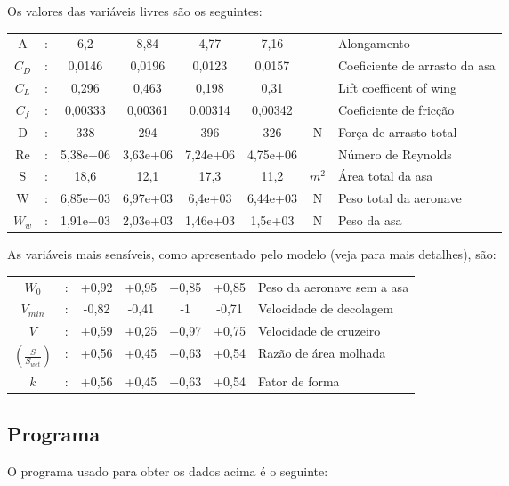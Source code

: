 \documentclass{article}
\begin{document}
Os valores das variáveis livres são os seguintes:

\begin{tabular}{|c c c c c c c l|}
  \hline
  A & : & 6,2 & 8,84 & 4,77 & 7,16 & & Alongamento \\ $C_D$ & : &
  0,0146 & 0,0196 & 0,0123 & 0,0157 & & Coeficiente de arrasto da asa
  \\ $C_L$ & : & 0,296 & 0,463 & 0,198 & 0,31 & & Lift coefficent of
  wing \\ $C_f$ & : & 0,00333 & 0,00361 & 0,00314 & 0,00342 & &
  Coeficiente de fricção \\ D & : & 338 & 294 & 396 & 326 & N & Força
  de arrasto total \\ Re & : & 5,38e+06 & 3,63e+06 & 7,24e+06 &
  4,75e+06 & & Número de Reynolds \\ S & : & 18,6 & 12,1 & 17,3 & 11,2
  & $m^2$ & Área total da asa \\ W & : & 6,85e+03 & 6,97e+03 & 6,4e+03
  & 6,44e+03 & N & Peso total da aeronave \\ $W_w$ & : & 1,91e+03 &
                                                                    2,03e+03 & 1,46e+03 & 1,5e+03 & N & Peso da asa \\
  \hline
\end{tabular}

As variáveis mais sensíveis, como apresentado pelo modelo (veja
\cite{gpkit} para mais detalhes), são:

\begin{tabular}{|c c c c c c l|}
  \hline
  $ W_0$ &: & +0,92 & +0,95 & +0,85 & +0,85 & Peso da aeronave sem a asa
  \\ $ V_{min}$ &: & -0,82 & -0,41 & -1 & -0,71 & Velocidade de
  decolagem \\ $ V$ &: & +0,59 & +0,25 & +0,97 & +0,75 & Velocidade de
  cruzeiro \\ $(\frac{S}{S_{wet}})$ &: & +0,56 & +0,45 & +0,63 & +0,54
  & Razão de área molhada \\ $ k$ &: & +0,56 & +0,45 & +0,63 & +0,54 &
                                                                       Fator de forma \\
  \hline
\end{tabular}

\pagebreak
\subsection*{Programa}
O programa usado para obter os dados acima é o seguinte:
\end{document}
